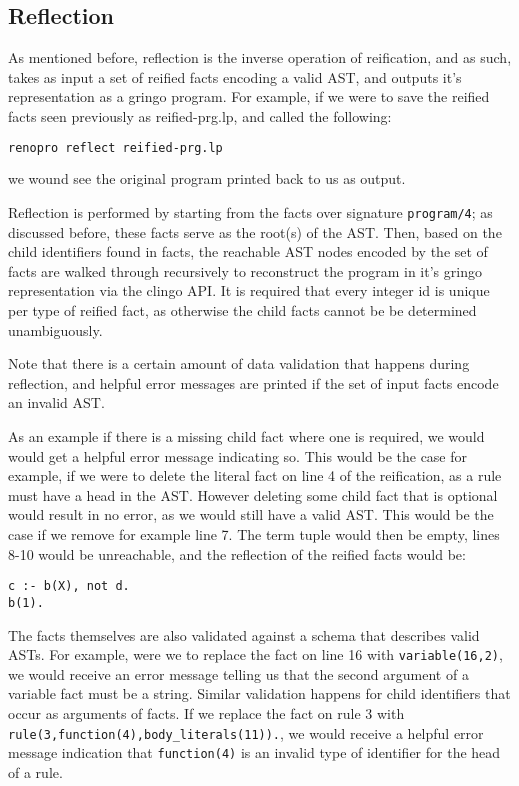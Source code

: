 \subsection{Reflection}

As mentioned before, reflection is the inverse operation of
reification, and as such, takes as input a set of reified facts
encoding a valid AST, and outputs it's representation as a gringo
program. For example, if we were to save the reified facts seen
previously as reified-prg.lp, and called the following:

\begin{lstlisting}[language=bash,numbers=none]
renopro reflect reified-prg.lp
\end{lstlisting}

we wound see the original program printed back to us as output.

Reflection is performed by starting from the facts over signature
\texttt{program/4}; as discussed before, these facts serve as the
root(s) of the AST. Then, based on the child identifiers found in
facts, the reachable AST nodes encoded by the set of facts are walked
through recursively to reconstruct the program in it's gringo
representation via the clingo API. It is required that every integer
id is unique per type of reified fact, as otherwise the child facts
cannot be be determined unambiguously.

Note that there is a certain amount of data validation that happens
during reflection, and helpful error messages are printed if the set
of input facts encode an invalid AST. 

As an example if there is a missing child fact where one is required,
we would would get a helpful error message indicating so. This would
be the case for example, if we were to delete the literal fact on line
4 of the reification, as a rule must have a head in the AST. However
deleting some child fact that is optional would result in no error, as
we would still have a valid AST. This would be the case if we remove
for example line 7. The term tuple would then be empty, lines 8-10
would be unreachable, and the reflection of the reified facts would
be:

\begin{lstlisting}[language=clingo]
c :- b(X), not d. 
b(1).
\end{lstlisting}

The facts themselves are also validated against a schema that
describes valid ASTs. For example, were we to replace the fact on line
16 with \texttt{variable(16,2)}, we would receive an error message
telling us that the second argument of a variable fact must be a
string. Similar validation happens for child identifiers that occur as
arguments of facts. If we replace the fact on rule 3 with
\texttt{rule(3,function(4),body\_literals(11)).}, we would receive a
helpful error message indication that \texttt{function(4)} is an
invalid type of identifier for the head of a rule.

